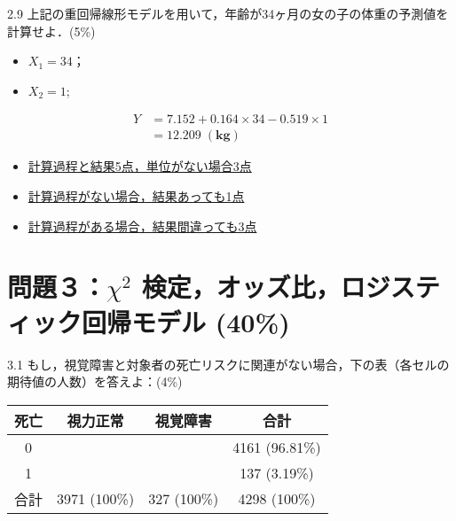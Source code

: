 \documentclass[11pt,]{problemset}
\providecommand{\tightlist}{%
  \setlength{\itemsep}{0pt}\setlength{\parskip}{0pt}}
\begin{document}
2.9
上記の重回帰線形モデルを用いて，年齢が34ヶ月の女の子の体重の予測値を計算せよ．(5\%)

\begin{itemize}
\tightlist
\item
  \(X_1 = 34\)；
\item
  \(X_2 = 1\);
\end{itemize}

\[
\begin{aligned}
Y & = 7.152 + 0.164 \times 34 -0.519\times 1 \\
  & = 12.209\; \mathbf{(kg)}
\end{aligned}
\]

\begin{itemize}
\item
  \underline{計算過程と結果5点，単位がない場合3点}
\item
  \underline{計算過程がない場合，結果あっても1点}
\item
  \underline{計算過程がある場合，結果間違っても3点}
\end{itemize}

\newpage

\hypertarget{chi2--40}{%
\section{\texorpdfstring{問題３：\(\chi^2\)
検定，オッズ比，ロジスティック回帰モデル
(40\%)}{問題３：\textbackslash{}chi\^{}2 検定，オッズ比，ロジスティック回帰モデル (40\%)}}\label{chi2--40}}

3.1
もし，視覚障害と対象者の死亡リスクに関連がない場合，下の表（各セルの期待値の人数）を答えよ：(4\%)
\bigskip\bigskip

\begin{center}
\begin{tabular}{|c|c|c|c|}
\hline
死亡 & 視力正常                      & 視覚障害                   & 合計             \\ \hline
0  &                                 &                            &   4161 (96.81\%)        \\ \hline
1  &                                 &                            &  137 (3.19\%)    \\ \hline
合計 & 3971 (100\%)             & 327 (100\%)            & 4298 (100\%)   \\ \hline
\end{tabular}
\end{center}
\bigskip\bigskip\bigskip\bigskip\bigskip
\end{document}
